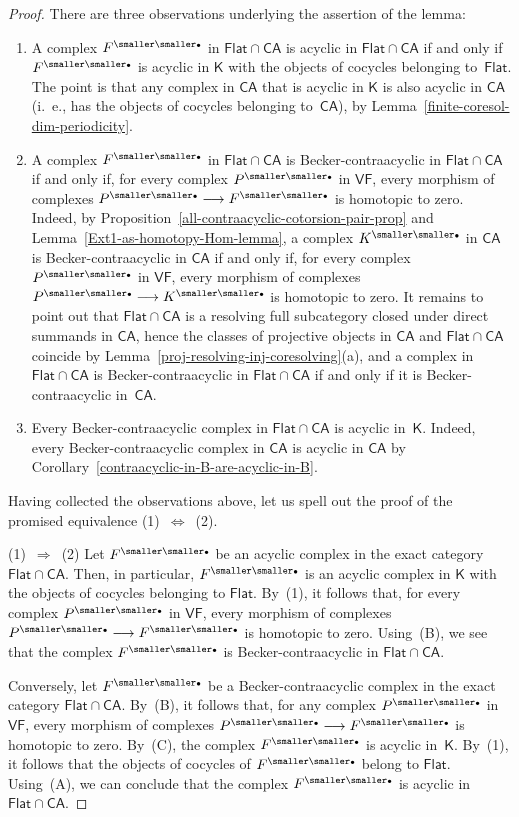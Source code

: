 \documentclass[10pt,a4paper]{amsart}
\newcommand{\CA}{\mathsf{CA}}
\newcommand{\Flat}{\mathsf{Flat}}
\newcommand{\VF}{\mathsf{VF}}
\newcommand{\bu}{{\text{\smaller\smaller$\scriptstyle\bullet$}}}
\newcommand{\rarrow}{\longrightarrow}
\newcommand{\sK}{\mathsf K}
\begin{document}
\begin{proof}
 There are three observations underlying the assertion of the lemma:
\begin{enumerate}
\renewcommand{\theenumi}{\Alph{enumi}}
\item A complex $F^\bu$ in $\Flat\cap\CA$ is acyclic in
$\Flat\cap\CA$ if and only if $F^\bu$ is acyclic in $\sK$ with
the objects of cocycles belonging to~$\Flat$.
 The point is that any complex in $\CA$ that is acyclic in $\sK$ is
also acyclic in $\CA$ (i.~e., has the objects of cocycles belonging
to~$\CA$), by Lemma~\ref{finite-coresol-dim-periodicity}.
\item A complex $F^\bu$ in $\Flat\cap\CA$ is Becker-contraacyclic
in $\Flat\cap\CA$ if and only if, for every complex $P^\bu$ in $\VF$,
every morphism of complexes $P^\bu\rarrow F^\bu$ is homotopic to zero.
 Indeed, by Proposition~\ref{all-contraacyclic-cotorsion-pair-prop} and
Lemma~\ref{Ext1-as-homotopy-Hom-lemma}, a complex $K^\bu$ in $\CA$ is
Becker-contraacyclic in $\CA$ if and only if, for every complex $P^\bu$
in $\VF$, every morphism of complexes $P^\bu\rarrow K^\bu$ is homotopic
to zero.
 It remains to point out that $\Flat\cap\CA$ is a resolving full
subcategory closed under direct summands in $\CA$, hence the classes of
projective objects in $\CA$ and $\Flat\cap\CA$ coincide by
Lemma~\ref{proj-resolving-inj-coresolving}(a), and a complex in
$\Flat\cap\CA$ is Becker-contraacyclic in $\Flat\cap\CA$ if and only
if it is Becker-contraacyclic in~$\CA$.
\item Every Becker-contraacyclic complex in $\Flat\cap\CA$ is
acyclic in~$\sK$.
 Indeed, every Becker-contraacyclic complex in $\CA$ is acyclic in
$\CA$ by Corollary~\ref{contraacyclic-in-B-are-acyclic-in-B}.
\end{enumerate}

 Having collected the observations above, let us spell out the proof
of the promised equivalence (1)~$\Longleftrightarrow$~(2).

 (1)~$\Longrightarrow$~(2) Let $F^\bu$ be an acyclic complex in
the exact category $\Flat\cap\CA$.
 Then, in particular, $F^\bu$ is an acyclic complex in $\sK$ with
the objects of cocycles belonging to $\Flat$.
 By~(1), it follows that, for every complex $P^\bu$ in $\VF$,
every morphism of complexes $P^\bu\rarrow F^\bu$ is homotopic to zero.
 Using~(B), we see that the complex $F^\bu$ is Becker-contraacyclic
in $\Flat\cap\CA$.

 Conversely, let $F^\bu$ be a Becker-contraacyclic complex in
the exact category $\Flat\cap\CA$.
 By~(B), it follows that, for any complex $P^\bu$ in $\VF$, every
morphism of complexes $P^\bu\rarrow F^\bu$ is homotopic to zero.
 By~(C), the complex $F^\bu$ is acyclic in~$\sK$.
 By~(1), it follows that the objects of cocycles of $F^\bu$ belong
to $\Flat$.
 Using~(A), we can conclude that the complex $F^\bu$ is acyclic
in $\Flat\cap\CA$.


\end{proof}
\end{document}
